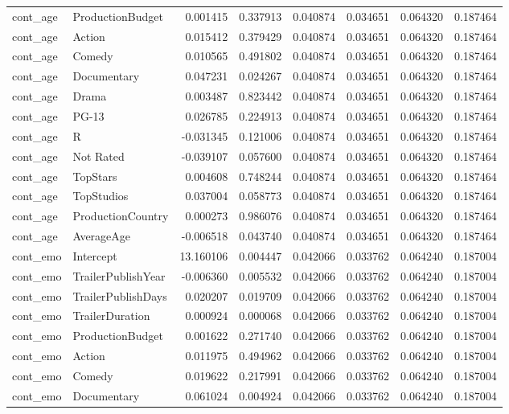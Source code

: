 \begin{tabular}{llrrrrrr}
cont_age & ProductionBudget & 0.001415 & 0.337913 & 0.040874 & 0.034651 & 0.064320 & 0.187464 \\
cont_age & Action & 0.015412 & 0.379429 & 0.040874 & 0.034651 & 0.064320 & 0.187464 \\
cont_age & Comedy & 0.010565 & 0.491802 & 0.040874 & 0.034651 & 0.064320 & 0.187464 \\
cont_age & Documentary & 0.047231 & 0.024267 & 0.040874 & 0.034651 & 0.064320 & 0.187464 \\
cont_age & Drama & 0.003487 & 0.823442 & 0.040874 & 0.034651 & 0.064320 & 0.187464 \\
cont_age & PG-13 & 0.026785 & 0.224913 & 0.040874 & 0.034651 & 0.064320 & 0.187464 \\
cont_age & R & -0.031345 & 0.121006 & 0.040874 & 0.034651 & 0.064320 & 0.187464 \\
cont_age & Not Rated & -0.039107 & 0.057600 & 0.040874 & 0.034651 & 0.064320 & 0.187464 \\
cont_age & TopStars & 0.004608 & 0.748244 & 0.040874 & 0.034651 & 0.064320 & 0.187464 \\
cont_age & TopStudios & 0.037004 & 0.058773 & 0.040874 & 0.034651 & 0.064320 & 0.187464 \\
cont_age & ProductionCountry & 0.000273 & 0.986076 & 0.040874 & 0.034651 & 0.064320 & 0.187464 \\
cont_age & AverageAge & -0.006518 & 0.043740 & 0.040874 & 0.034651 & 0.064320 & 0.187464 \\
cont_emo & Intercept & 13.160106 & 0.004447 & 0.042066 & 0.033762 & 0.064240 & 0.187004 \\
cont_emo & TrailerPublishYear & -0.006360 & 0.005532 & 0.042066 & 0.033762 & 0.064240 & 0.187004 \\
cont_emo & TrailerPublishDays & 0.020207 & 0.019709 & 0.042066 & 0.033762 & 0.064240 & 0.187004 \\
cont_emo & TrailerDuration & 0.000924 & 0.000068 & 0.042066 & 0.033762 & 0.064240 & 0.187004 \\
cont_emo & ProductionBudget & 0.001622 & 0.271740 & 0.042066 & 0.033762 & 0.064240 & 0.187004 \\
cont_emo & Action & 0.011975 & 0.494962 & 0.042066 & 0.033762 & 0.064240 & 0.187004 \\
cont_emo & Comedy & 0.019622 & 0.217991 & 0.042066 & 0.033762 & 0.064240 & 0.187004 \\
cont_emo & Documentary & 0.061024 & 0.004924 & 0.042066 & 0.033762 & 0.064240 & 0.187004 \\

\end{tabular}
